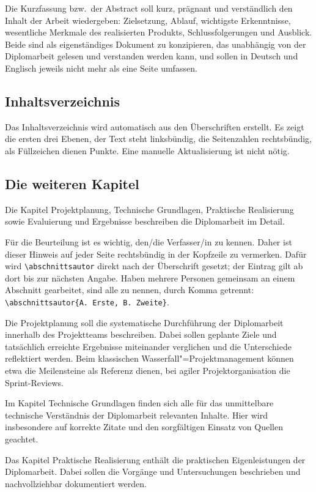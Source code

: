Die Kurzfassung bzw.\ der Abstract soll kurz, prägnant und verständlich den
Inhalt der Arbeit wiedergeben: Zielsetzung, Ablauf, wichtigste Erkenntnisse,
wesentliche Merkmale des realisierten Produkts, Schlussfolgerungen und
Ausblick. Beide sind als eigenständiges Dokument zu konzipieren, das
unabhängig von der Diplomarbeit gelesen und verstanden werden kann, und
sollen in Deutsch und Englisch jeweils nicht mehr als eine Seite umfassen.

\subsection{Inhaltsverzeichnis}

Das Inhaltsverzeichnis wird automatisch aus den Überschriften erstellt. Es
zeigt die ersten drei Ebenen, der Text steht linksbündig, die Seitenzahlen
rechtsbündig, als Füllzeichen dienen Punkte. Eine manuelle Aktualisierung
ist nicht nötig.

\subsection{Die weiteren Kapitel}

Die Kapitel Projektplanung, Technische Grundlagen, Praktische Realisierung
sowie Evaluierung und Ergebnisse beschreiben die Diplomarbeit im Detail.

Für die Beurteilung ist es wichtig, den/die Verfasser/in zu kennen. Daher
ist dieser Hinweis auf jeder Seite rechtsbündig in der Kopfzeile zu
vermerken. Dafür wird \lstinline|\abschnittsautor| direkt nach der
Überschrift gesetzt; der Eintrag gilt ab dort bis zur nächsten Angabe.
Haben mehrere Personen gemeinsam an einem Abschnitt gearbeitet, sind alle zu
nennen, durch Komma getrennt:
\lstinline|\abschnittsautor{A. Erste, B. Zweite}|.

Die Projektplanung soll die systematische Durchführung der Diplomarbeit
innerhalb des Projektteams beschreiben. Dabei sollen geplante Ziele und
tatsächlich erreichte Ergebnisse miteinander verglichen und die Unterschiede
reflektiert werden. Beim klassischen Wasserfall"=Projektmanagement können
etwa die Meilensteine als Referenz dienen, bei agiler Projektorganisation
die Sprint-Reviews.

Im Kapitel Technische Grundlagen finden sich alle für das unmittelbare
technische Verständnis der Diplomarbeit relevanten Inhalte. Hier wird
insbesondere auf korrekte Zitate und den sorgfältigen Einsatz von Quellen
geachtet.

Das Kapitel Praktische Realisierung enthält die praktischen Eigenleistungen
der Diplomarbeit. Dabei sollen die Vorgänge und Untersuchungen beschrieben
und nachvollziehbar dokumentiert werden.

